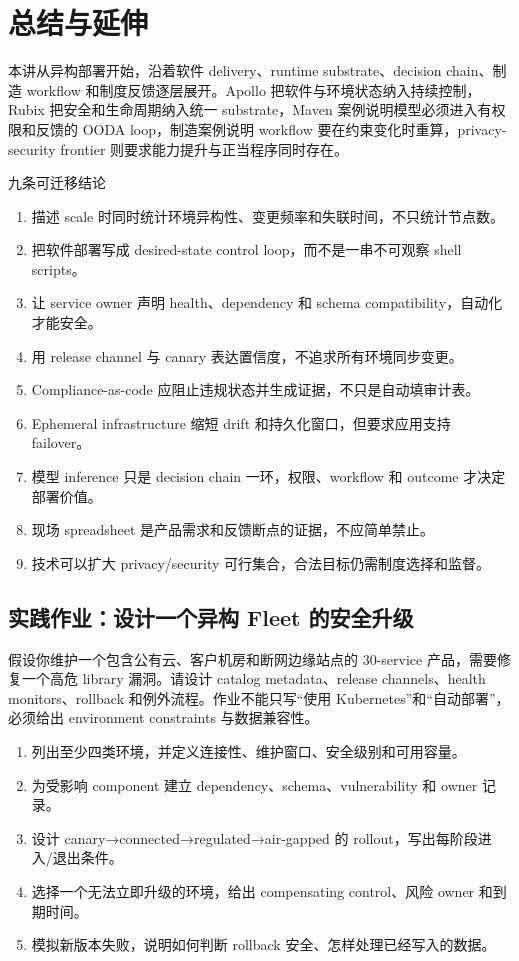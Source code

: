 \section{总结与延伸}

本讲从异构部署开始，沿着软件 delivery、runtime substrate、decision chain、制造 workflow 和制度反馈逐层展开。Apollo 把软件与环境状态纳入持续控制，Rubix 把安全和生命周期纳入统一 substrate，Maven 案例说明模型必须进入有权限和反馈的 OODA loop，制造案例说明 workflow 要在约束变化时重算，privacy-security frontier 则要求能力提升与正当程序同时存在。

\begin{importantbox}{九条可迁移结论}
\begin{enumerate}
  \item 描述 scale 时同时统计环境异构性、变更频率和失联时间，不只统计节点数。
  \item 把软件部署写成 desired-state control loop，而不是一串不可观察 shell scripts。
  \item 让 service owner 声明 health、dependency 和 schema compatibility，自动化才能安全。
  \item 用 release channel 与 canary 表达置信度，不追求所有环境同步变更。
  \item Compliance-as-code 应阻止违规状态并生成证据，不只是自动填审计表。
  \item Ephemeral infrastructure 缩短 drift 和持久化窗口，但要求应用支持 failover。
  \item 模型 inference 只是 decision chain 一环，权限、workflow 和 outcome 才决定部署价值。
  \item 现场 spreadsheet 是产品需求和反馈断点的证据，不应简单禁止。
  \item 技术可以扩大 privacy/security 可行集合，合法目标仍需制度选择和监督。
\end{enumerate}
\end{importantbox}

\subsection{实践作业：设计一个异构 Fleet 的安全升级}

假设你维护一个包含公有云、客户机房和断网边缘站点的 30-service 产品，需要修复一个高危 library 漏洞。请设计 catalog metadata、release channels、health monitors、rollback 和例外流程。作业不能只写“使用 Kubernetes”和“自动部署”，必须给出 environment constraints 与数据兼容性。

\begin{enumerate}
  \item 列出至少四类环境，并定义连接性、维护窗口、安全级别和可用容量。
  \item 为受影响 component 建立 dependency、schema、vulnerability 和 owner 记录。
  \item 设计 canary→connected→regulated→air-gapped 的 rollout，写出每阶段进入/退出条件。
  \item 选择一个无法立即升级的环境，给出 compensating control、风险 owner 和到期时间。
  \item 模拟新版本失败，说明如何判断 rollback 安全、怎样处理已经写入的数据。
\end{enumerate}

